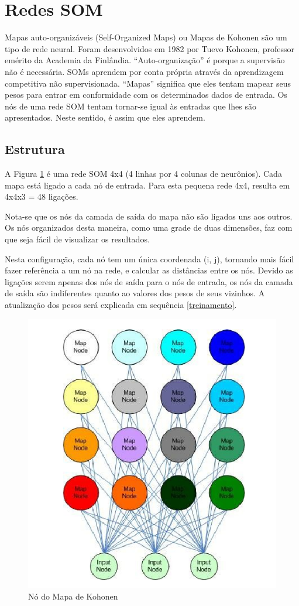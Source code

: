 \section{Redes SOM}\label{som}
Mapas auto-organizáveis (Self-Organized Maps) ou Mapas de Kohonen são um tipo de rede neural. Foram desenvolvidos em 1982 por Tuevo Kohonen, professor emérito da Academia da Finlândia. ``Auto-organização'' é porque a supervisão não é
necessária. SOMs aprendem por conta própria através da aprendizagem competitiva não supervisionada. ``Mapas'' significa que eles tentam mapear seus pesos para entrar em conformidade com os determinados dados de entrada. Os nós de uma rede SOM tentam tornar-se igual às entradas que lhes são apresentados. Neste sentido, é assim que eles aprendem.

\subsection{Estrutura}

A Figura \ref{fig:som-node} é uma rede SOM 4x4 (4 linhas por 4 colunas de neurônios). Cada mapa está ligado a cada nó de entrada. Para esta pequena rede 4x4, resulta em 4x4x3 = 48 ligações. 

Nota-se que os nós da camada de saída do mapa não são ligados uns aos outros. Os nós organizados desta maneira, como uma grade de duas dimensões, faz com que seja fácil de visualizar os resultados. 

Nesta configuração, cada nó tem um única coordenada (i, j), tornando mais fácil fazer referência a um nó na rede, e calcular as distâncias entre os nós. Devido as ligações serem apenas dos nós de saída para o nós de entrada, os nós da camada de saída são indiferentes quanto ao valores dos pesos de seus vizinhos. A atualização dos pesos será explicada em sequência \ref{treinamento}.

\begin{figure}[ht]
\centering
\includegraphics[scale=0.5]{imgs/node-som.png}
\caption{Nó do Mapa de Kohonen}
\label{fig:som-node}
\end{figure}